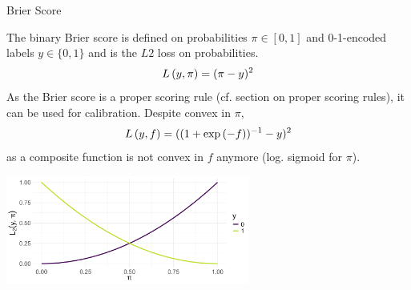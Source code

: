 \documentclass[11pt,compress,t,notes=noshow, xcolor=table]{beamer}
\begin{document}


\begin{vbframe}{Brier Score}

The binary Brier score is defined on probabilities $\pi \in [0, 1]$ and 0-1-encoded labels $y \in \{0, 1\}$ and is the $L2$ loss on probabilities.
\begin{equation*}
L\left(y, \pi\right) = (\pi - y)^2
\end{equation*}
As the Brier score is a proper scoring rule (cf. section on proper scoring rules), it can be used for calibration. %
Despite convex in $\pi$, $$L\left(y, f\right)=((1+\exp{(-f)})^{-1}-y)^2$$ as a composite function is not convex in $f$ anymore (log. sigmoid for $\pi$).
\vspace{-0.2cm}
\begin{center}
\includegraphics[width = 0.6\textwidth]{figure/brier.png}
\end{center}


\end{vbframe}
\end{document}
